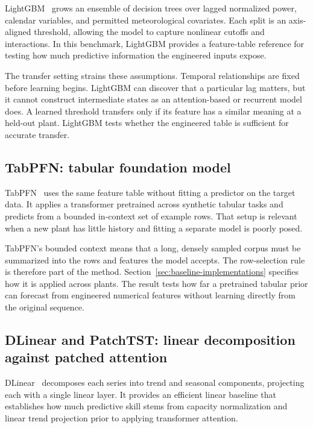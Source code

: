 LightGBM~\cite{lightgbm} grows an ensemble of decision trees over lagged normalized power, calendar variables, and permitted meteorological covariates. Each split is an axis-aligned threshold, allowing the model to capture nonlinear cutoffs and interactions. In this benchmark, LightGBM provides a feature-table reference for testing how much predictive information the engineered inputs expose.

The transfer setting strains these assumptions. Temporal relationships are fixed before learning begins. LightGBM can discover that a particular lag matters, but it cannot construct intermediate states as an attention-based or recurrent model does. A learned threshold transfers only if its feature has a similar meaning at a held-out plant. LightGBM tests whether the engineered table is sufficient for accurate transfer.

\subsection{TabPFN: tabular foundation model}
\label{sec:rw-tabpfn}

TabPFN~\cite{tabpfn3} uses the same feature table without fitting a predictor on the target data. It applies a transformer pretrained across synthetic tabular tasks and predicts from a bounded in-context set of example rows. That setup is relevant when a new plant has little history and fitting a separate model is poorly posed.

TabPFN's bounded context means that a long, densely sampled corpus must be summarized into the rows and features the model accepts. The row-selection rule is therefore part of the method. Section~\ref{sec:baseline-implementations} specifies how it is applied across plants. The result tests how far a pretrained tabular prior can forecast from engineered numerical features without learning directly from the original sequence.

\subsection{DLinear and PatchTST: linear decomposition against patched attention}
\label{sec:rw-dlinear-patchtst}

DLinear~\cite{dlinear} decomposes each series into trend and seasonal components, projecting each with a single linear layer. It provides an efficient linear baseline that establishes how much predictive skill stems from capacity normalization and linear trend projection prior to applying transformer attention.

